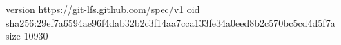 version https://git-lfs.github.com/spec/v1
oid sha256:29ef7a6594ae96f4dab32b2c3f14aa7cca133fe34a0eed8b2c570bc5cd4d5f7a
size 10930
